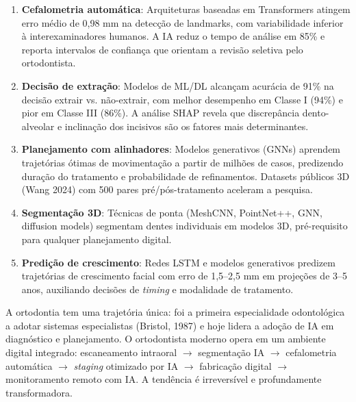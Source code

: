 \begin{enumerate}
    \item \textbf{Cefalometria automática}: Arquiteturas baseadas em Transformers atingem erro médio de 0,98 mm na detecção de landmarks, com variabilidade inferior à interexaminadores humanos. A IA reduz o tempo de análise em 85\% e reporta intervalos de confiança que orientam a revisão seletiva pelo ortodontista.
    
    \item \textbf{Decisão de extração}: Modelos de ML/DL alcançam acurácia de 91\% na decisão extrair vs. não-extrair, com melhor desempenho em Classe I (94\%) e pior em Classe III (86\%). A análise SHAP revela que discrepância dento-alveolar e inclinação dos incisivos são os fatores mais determinantes.
    
    \item \textbf{Planejamento com alinhadores}: Modelos generativos (GNNs) aprendem trajetórias ótimas de movimentação a partir de milhões de casos, predizendo duração do tratamento e probabilidade de refinamentos. Datasets públicos 3D (Wang 2024) com 500 pares pré/pós-tratamento aceleram a pesquisa.
    
    \item \textbf{Segmentação 3D}: Técnicas de ponta (MeshCNN, PointNet++, GNN, diffusion models) segmentam dentes individuais em modelos 3D, pré-requisito para qualquer planejamento digital.
    
    \item \textbf{Predição de crescimento}: Redes LSTM e modelos generativos predizem trajetórias de crescimento facial com erro de 1,5--2,5 mm em projeções de 3--5 anos, auxiliando decisões de \textit{timing} e modalidade de tratamento.
\end{enumerate}

A ortodontia tem uma trajetória única: foi a primeira especialidade odontológica a adotar sistemas especialistas (Bristol, 1987) e hoje lidera a adoção de IA em diagnóstico e planejamento. O ortodontista moderno opera em um ambiente digital integrado: escaneamento intraoral $\rightarrow$ segmentação IA $\rightarrow$ cefalometria automática $\rightarrow$ \textit{staging} otimizado por IA $\rightarrow$ fabricação digital $\rightarrow$ monitoramento remoto com IA. A tendência é irreversível e profundamente transformadora.

